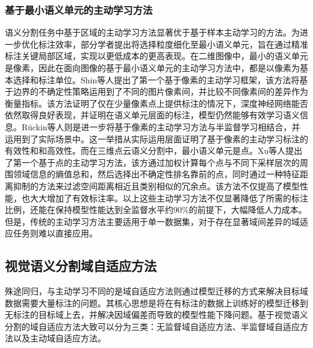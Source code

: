 \subsubsection{基于最小语义单元的主动学习方法}
语义分割任务中基于区域的主动学习方法显著优于基于样本主动学习的方法。为进一步优化标注效率，部分学者提出将选择粒度细化至最小语义单元，旨在通过精准标注关键局部区域，实现以更低成本的更高表现。在二维图像中，最小的语义单元是像素，因此在面向图像的基于最小语义单元的主动学习方法中，都是以像素为基本选择和标注单位。Shin等人提出了第一个基于像素的主动学习框架，该方法将基于边界的不确定性策略运用到了不同的图片像素间，并比较不同像素间的差异作为衡量指标。该方法证明了仅在少量像素点上提供标注的情况下，深度神经网络能否依然取得良好表现，并证明在语义单元层面的标注，模型仍然能够有效学习语义信息。Rückin等人则是进一步将基于像素的主动学习方法与半监督学习相结合，并运用到了实际场景中。这一举措从实际运用层面证明了基于像素的主动学习标注的有效性和和高效性。而在三维点云语义分割中，最小语义单元是点。Xu等人提出了第一个基于点的主动学习方法，该方通过加权计算每个点与不同下采样层次的周围领域信息的熵值总和，然后选择出不确定性排名靠前的点，同时通过一种特征距离抑制的方法来过滤空间距离相近且类别相似的冗余点。该方法不仅提高了模型性能，也大大增加了有效标注率。以上这些主动学习方法不仅显著降低了所需的标注比例，还能在保持模型性能达到全监督水平约90\%的前提下，大幅降低人力成本。但是，传统的主动学习方法主要适用于单一数据集，对于存在显著域间差异的域适应任务则难以直接应用。
\subsection{视觉语义分割域自适应方法}
殊途同归，与主动学习不同的是域自适应方法则通过模型迁移的方式来解决目标域数据需要大量标注的问题。其核心思想是将在有标注的数据上训练好的模型迁移到无标注的目标域上去，并解决因域偏差而导致的模型性能下降问题。基于视觉语义分割的域自适应方法大致可以分为三类：无监督域自适应方法、半监督域自适应方法以及主动域自适应方法。
